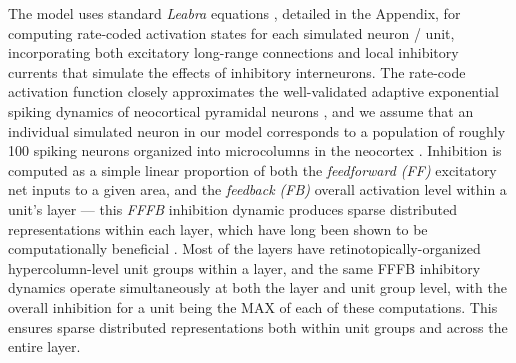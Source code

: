 \documentclass[11pt,twoside]{article}
\newif\myifpdf
\begin{document}
The model uses standard {\em Leabra} equations \cite{OReillyHazyHerd15,OReillyMunakataFrankEtAl12,OReillyMunakata00}, detailed in the Appendix, for computing rate-coded activation states for each simulated neuron / unit, incorporating both excitatory long-range connections and local inhibitory currents that simulate the effects of inhibitory interneurons.  The rate-code activation function closely approximates the well-validated adaptive exponential spiking dynamics of neocortical pyramidal neurons \cite{BretteGerstner05}, and we assume that an individual simulated neuron in our model corresponds to a population of roughly 100 spiking neurons organized into microcolumns in the neocortex \cite{BuxhoevedenCasanova02,Mountcastle57,Mountcastle97,RaoWilliamsGoldman-Rakic99}.  Inhibition is computed as a simple linear proportion of both the {\em feedforward (FF)} excitatory net inputs to a given area, and the {\em feedback (FB)} overall activation level within a unit's layer --- this {\em FFFB} inhibition dynamic produces sparse distributed representations within each layer, which have long been shown to be computationally beneficial \cite{Kanerva88,Barlow89,Field94,OlshausenField97}.  Most of the layers have retinotopically-organized hypercolumn-level unit groups within a layer, and the same FFFB inhibitory dynamics operate simultaneously at both the layer and unit group level, with the overall inhibition for a unit being the MAX of each of these computations.  This ensures sparse distributed representations both within unit groups and across the entire layer.
\end{document}

